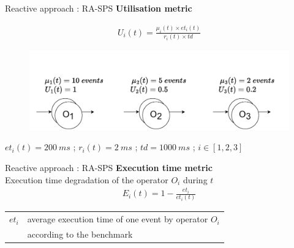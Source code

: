 \begin{frame}{Reactive approach : RA-SPS}
	\textbf{Utilisation metric}
	\begin{center}
	\begin{align*}
        U_i(t) = \frac{\mu_i(t) \times et_i(t)}{r_i(t) \times td}
   	\end{align*}
   	\vspace*{-1cm}
   	\begin{figure}
   		\includegraphics[scale=0.5]{images/concepts/reactive/RA-SPS-Metric-U.pdf}
   	\end{figure}
 	
  	$et_i(t) = 200~ms$ ; $r_i(t) = 2~ms$ ; $td = 1000~ms$ ; $i \in [1,2,3]$
  	\end{center}
\end{frame}
   	
\begin{frame}{Reactive approach : RA-SPS}
	\textbf{Execution time metric}\\
	\vspace*{0.2cm}
	Execution time degradation of the operator $O_i$ during $t$
   	\begin{align*}
        E_i(t) = 1-\frac{et_i}{et_i(t)}
    \end{align*}
    \vspace*{0.2cm}
    
    \begin{tabular}{r l}
	${et}_i$ & average execution time of one event by operator $O_i$ \\
	 		 & according to the benchmark\\
   	\end{tabular}
\end{frame}

